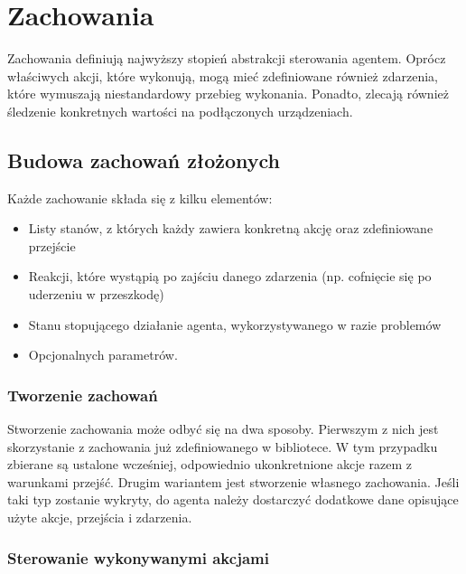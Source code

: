 \chapter{Zachowania}
\label{ch:zachowania}

Zachowania definiują najwyższy stopień abstrakcji sterowania agentem. Oprócz właściwych akcji, które wykonują, mogą mieć zdefiniowane również zdarzenia, które wymuszają niestandardowy przebieg wykonania. Ponadto, zlecają również śledzenie konkretnych wartości na podłączonych urządzeniach.

\section{Budowa zachowań złożonych}

Każde zachowanie składa się z kilku elementów:
\begin{itemize}
    \item Listy stanów, z których każdy zawiera konkretną akcję oraz zdefiniowane przejście
    \item Reakcji, które wystąpią po zajściu danego zdarzenia (np. cofnięcie się po\,uderzeniu w przeszkodę)
    \item Stanu stopującego działanie agenta, wykorzystywanego w razie problemów
    \item Opcjonalnych parametrów.
\end{itemize}

\subsection{Tworzenie zachowań}

Stworzenie zachowania może odbyć się na dwa sposoby. Pierwszym z nich jest skorzystanie z zachowania już zdefiniowanego w bibliotece. W tym przypadku zbierane są ustalone wcześniej, odpowiednio ukonkretnione akcje razem z warunkami przejść. Drugim wariantem jest stworzenie własnego zachowania. Jeśli taki typ zostanie wykryty, do agenta należy dostarczyć dodatkowe dane opisujące użyte akcje, przejścia i zdarzenia.


\subsection{Sterowanie wykonywanymi akcjami}

